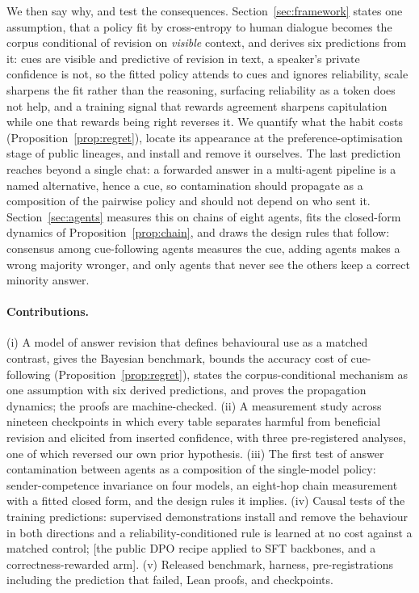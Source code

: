 \documentclass{article}
\newcommand{\pending}[1]{\textcolor{blue!70!black}{[#1]}}
\begin{document}
We then say why, and test the consequences. Section~\ref{sec:framework} states one assumption, that a policy fit by cross-entropy to human dialogue becomes the corpus conditional of revision on \emph{visible} context, and derives six predictions from it: cues are visible and predictive of revision in text, a speaker's private confidence is not, so the fitted policy attends to cues and ignores reliability, scale sharpens the fit rather than the reasoning, surfacing reliability as a token does not help, and a training signal that rewards agreement sharpens capitulation while one that rewards being right reverses it. We quantify what the habit costs (Proposition~\ref{prop:regret}), locate its appearance at the preference-optimisation stage of public lineages, and install and remove it ourselves. The last prediction reaches beyond a single chat: a forwarded answer in a multi-agent pipeline is a named alternative, hence a cue, so contamination should propagate as a composition of the pairwise policy and should not depend on who sent it. Section~\ref{sec:agents} measures this on chains of eight agents, fits the closed-form dynamics of Proposition~\ref{prop:chain}, and draws the design rules that follow: consensus among cue-following agents measures the cue, adding agents makes a wrong majority wronger, and only agents that never see the others keep a correct minority answer.

\paragraph{Contributions.} (i) A model of answer revision that defines behavioural use as a matched contrast, gives the Bayesian benchmark, bounds the accuracy cost of cue-following (Proposition~\ref{prop:regret}), states the corpus-conditional mechanism as one assumption with six derived predictions, and proves the propagation dynamics; the proofs are machine-checked. (ii) A measurement study across nineteen checkpoints in which every table separates harmful from beneficial revision and elicited from inserted confidence, with three pre-registered analyses, one of which reversed our own prior hypothesis. (iii) The first test of answer contamination between agents as a composition of the single-model policy: sender-competence invariance on four models, an eight-hop chain measurement with a fitted closed form, and the design rules it implies. (iv) Causal tests of the training predictions: supervised demonstrations install and remove the behaviour in both directions and a reliability-conditioned rule is learned at no cost against a matched control; \pending{the public DPO recipe applied to SFT backbones, and a correctness-rewarded arm}. (v) Released benchmark, harness, pre-registrations including the prediction that failed, Lean proofs, and checkpoints.
\end{document}
